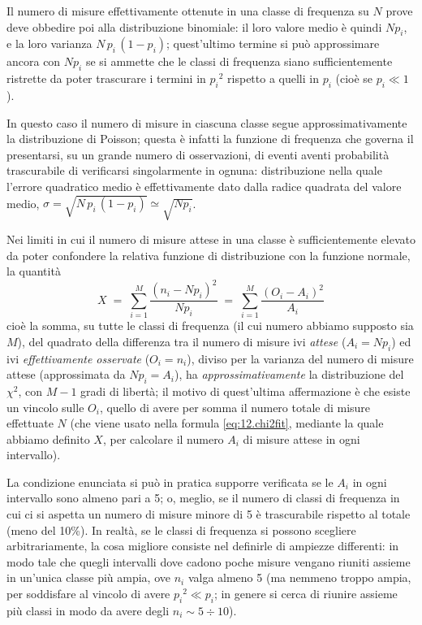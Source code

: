 Il numero di misure effettivamente ottenute in una classe di
frequenza su $N$ prove deve obbedire poi alla distribuzione
binomiale: il loro valore medio \`e quindi $N p_i$, e la
loro varianza $N \, p_i \, (1 - p_i)$; quest'ultimo termine
si pu\`o approssimare ancora con $N p_i$ se si ammette che
le classi di frequenza%
siano sufficientemente ristrette da poter trascurare i
termini in ${p_i}^2$ rispetto a quelli in $p_i$ (cio\`e se
$p_i \ll 1$).

In questo caso il numero di misure in ciascuna classe segue
approssimativamente la distribuzione di Poisson; questa \`e
infatti la funzione di frequenza che governa il presentarsi,
su un grande numero di osservazioni, di eventi aventi
probabilit\`a trascurabile di verificarsi singolarmente in
ognuna: distribuzione nella quale l'errore quadratico medio
\`e effettivamente dato dalla radice quadrata del valore
medio, $\sigma = \sqrt{N \, p_i \, (1 - p_i)} \simeq \sqrt{N
  p_i}$.

Nei limiti in cui il numero di misure attese in una classe
\`e sufficientemente elevato da poter confondere la relativa
funzione di distribuzione con la funzione normale, la
quantit\`a
\begin{equation} \label{eq:12.chi2fit}
  X \; = \;\sum_{i=1}^M
    \frac{(n_i - N p_i)^2}{N p_i} \; = \; \sum_{i=1}^M
    \frac{(O_i - A_i)^2}{A_i}
\end{equation}
cio\`e la somma, su tutte le classi di frequenza (il cui
numero abbiamo supposto sia $M$), del quadrato della
differenza tra il numero di misure ivi \emph{attese} ($A_i =
N p_i$) ed ivi \emph{effettivamente osservate} ($O_i =
n_i$), diviso per la varianza del numero di misure attese
(approssimata da $N p_i = A_i$), ha
\emph{approssimativamente} la distribuzione del $\chi^2$,
con $M - 1$ gradi di libert\`a; il motivo di quest'ultima
affermazione \`e che esiste un vincolo sulle $O_i$, quello
di avere per somma il numero totale di misure effettuate $N$
(che viene usato nella formula \eqref{eq:12.chi2fit},
mediante la quale abbiamo definito $X$, per calcolare il
numero $A_i$ di misure attese in ogni intervallo).

La condizione enunciata si pu\`o in pratica supporre
verificata se le $A_i$ in ogni intervallo sono almeno pari a
5; o, meglio, se il numero di classi di frequenza%
in cui ci si aspetta un numero di misure minore di 5 \`e
trascurabile rispetto al totale (meno del 10\%).  In
realt\`a, se le classi di frequenza si possono scegliere
arbitrariamente, la cosa migliore consiste nel definirle di
ampiezze differenti: in modo tale che quegli intervalli dove
cadono poche misure vengano riuniti assieme in un'unica
classe pi\`u ampia, ove $n_i$ valga almeno 5 (ma nemmeno
troppo ampia, per soddisfare al vincolo di avere ${p_i}^2
\ll p_i$; in genere si cerca di riunire assieme pi\`u classi
in modo da avere degli $n_i \sim 5\div 10$).

